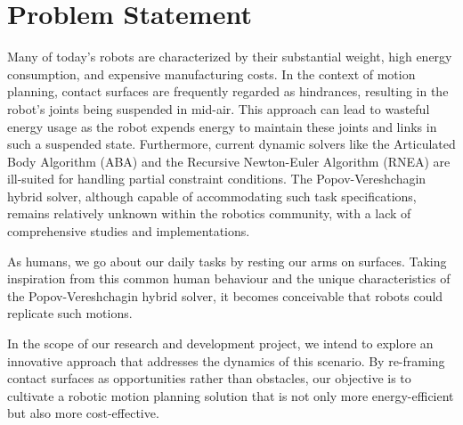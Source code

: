 \documentclass[report.tex]{subfiles}
\begin{document}
    \chapter{Problem Statement}
    Many of today's robots are characterized by their substantial weight, high energy consumption, and expensive manufacturing costs. In the context of motion planning, contact surfaces are frequently regarded as hindrances, resulting in the robot's joints being suspended in mid-air. This approach can lead to wasteful energy usage as the robot expends energy to maintain these joints and links in such a suspended state. Furthermore, current dynamic solvers like the Articulated Body Algorithm (ABA) and the Recursive Newton-Euler Algorithm (RNEA) are ill-suited for handling partial constraint conditions. The Popov-Vereshchagin hybrid solver, although capable of accommodating such task specifications, remains relatively unknown within the robotics community, with a lack of comprehensive studies and implementations.

    As humans, we go about our daily tasks by resting our arms on surfaces. Taking inspiration from this common human behaviour and the unique characteristics of the Popov-Vereshchagin hybrid solver, it becomes conceivable that robots could replicate such motions.
    
    In the scope of our research and development project, we intend to explore an innovative approach that addresses the dynamics of this scenario. By re-framing contact surfaces as opportunities rather than obstacles, our objective is to cultivate a robotic motion planning solution that is not only more energy-efficient but also more cost-effective.
\end{document}
